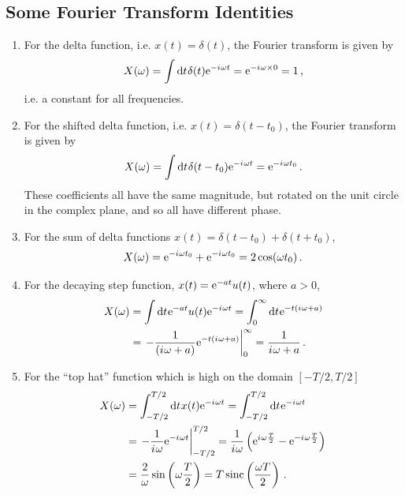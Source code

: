 \subsection{Some Fourier Transform Identities}
%
\begin{enumerate}
\item For the delta function, i.e. $x(t) = \delta(t)$, the Fourier transform is
  given by
  \begin{displaymath}
    X(\omega) = \int \mathrm{d}t\mkern1mu \delta(t)\mathrm{e}^{-{i\mkern1mu}\omega t} = \mathrm{e}^{-{i\mkern1mu}\omega\times 0} = 1 \,,
  \end{displaymath}
  i.e. a constant for all frequencies.
\item For the shifted delta function, i.e. $x(t) = \delta(t-t_0)$, the Fourier transform
  is given by
  \begin{displaymath}
    X(\omega) = \int \mathrm{d}t\mkern1mu \delta(t-t_0)\mathrm{e}^{-{i\mkern1mu}\omega t} = \mathrm{e}^{-{i\mkern1mu}\omega t_0} \,.
  \end{displaymath}
  These coefficients all have the same magnitude, but rotated on the unit circle in
  the complex plane, and so all have different phase.
\item For the sum of delta functions $x(t) = \delta(t-t_0) + \delta(t+t_0)$,
  \begin{displaymath}
    X(\omega) = \mathrm{e}^{-{i\mkern1mu}\omega t_0} + \mathrm{e}^{-{i\mkern1mu}\omega t_0} = 2\cos(\omega t_0) \,.
  \end{displaymath}
\item For the decaying step function, $x(t) = \mathrm{e}^{-at}u(t)$, where $a > 0$,
  \begin{align*}
    X(\omega) &= \int \mathrm{d}t\mkern1mu \mathrm{e}^{-at}u(t)\mathrm{e}^{-{i\mkern1mu}\omega t} = \int_0^\infty\mathrm{d}t\mkern1mu \mathrm{e}^{-t({i\mkern1mu}\omega + a)} \\
    &= \left.-\frac{1}{({i\mkern1mu}\omega + a)} \mathrm{e}^{-t({i\mkern1mu}\omega + a)}\right|_0^\infty = \frac{1}{{i\mkern1mu}\omega + a} \,.
  \end{align*}
\item For the ``top hat'' function which is high on the domain $[-T/2,T/2]$
  \begin{align*}
    X(\omega) &= \int_{-T/2}^{T/2}\dx{t}x(t)\ex{-\im\omega t} = \int_{-T/2}^{T/2}\dx{t}\ex{-\im\omega t} \\
    &= \left.-\frac{1}{\im\omega} \ex{-\im\omega t}\right|_{-T/2}^{T/2} = \frac{1}{\im\omega}
    \left(\ex{\im\omega\frac{T}{2}} - \ex{-\im\omega\frac{T}{2}}\right) \\
    &= \frac{2}{\omega}\sin\left(\omega\frac{T}{2}\right) = T\sinc\left(\frac{\omega T}{2}\right) \,.

\end{align*}
\end{enumerate}
